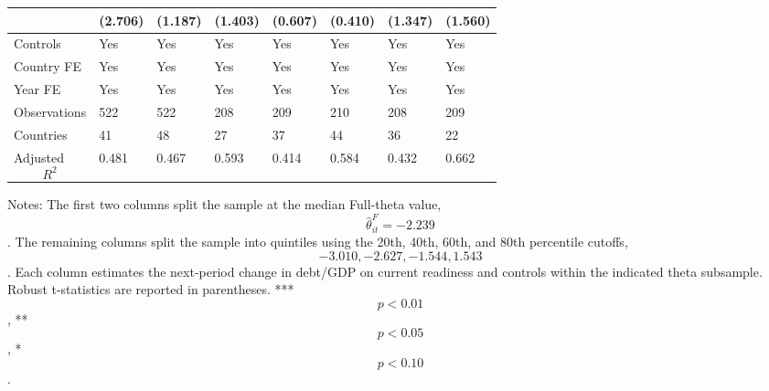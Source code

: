 \begin{table}[H]
\begin{threeparttable}
\begin{tabularx}{\textwidth}{lYYYYYYY}
  & (2.706) & (1.187) & (1.403) & (0.607) & (0.410) & (1.347) & (1.560) \\
\midrule
Controls & Yes & Yes & Yes & Yes & Yes & Yes & Yes \\
Country FE & Yes & Yes & Yes & Yes & Yes & Yes & Yes \\
Year FE & Yes & Yes & Yes & Yes & Yes & Yes & Yes \\
Observations & 522 & 522 & 208 & 209 & 210 & 208 & 209 \\
Countries & 41 & 48 & 27 & 37 & 44 & 36 & 22 \\
Adjusted $$R^2$$ & 0.481 & 0.467 & 0.593 & 0.414 & 0.584 & 0.432 & 0.662 \\
\bottomrule
\end{tabularx}
\begin{tablenotes}[flushleft]\footnotesize
\item Notes: The first two columns split the sample at the median Full-theta value, $$\widehat{\theta}^{F}_{it}=-2.239$$. The remaining columns split the sample into quintiles using the 20th, 40th, 60th, and 80th percentile cutoffs, $$-3.010, -2.627, -1.544, 1.543$$. Each column estimates the next-period change in debt/GDP on current readiness and controls within the indicated theta subsample. Robust t-statistics are reported in parentheses. *** $$p<0.01$$, ** $$p<0.05$$, * $$p<0.10$$.
\end{tablenotes}
\end{threeparttable}
\end{table}
